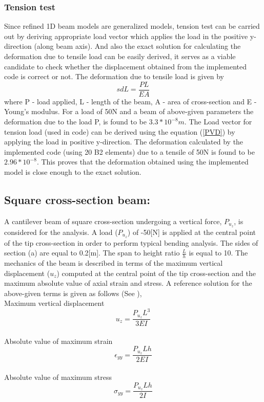\documentclass[a4paper,12pt]{article}
\begin{document}
\subsubsection*{Tension test}
\indent\indent\indent\indent Since refined 1D beam models are generalized models, tension test can be carried out by deriving appropriate load vector which applies the load in the positive y-direction (along beam axis). And also the exact solution for calculating the deformation due to tensile load can be easily derived, it serves as a viable candidate to check whether the displacement obtained from the implemented code is correct or not. The deformation due to tensile load is given by 
\begin{equation}s
dL = \frac{P L}{E A}
\label{exactdef}
\end{equation}
where P - load applied, L - length of the beam, A - area of cross-section and E - Young's modulus. For a load of 50N and a beam of above-given parameters the deformation due to the load P, is found to be $3.3*10^{-8}m$. The Load vector for tension load (used in code) can be derived using the equation (\ref{PVD}) by applying the load in positive y-direction. The deformation calculated by the implemented code (using 20 B2 elements) due to a tensile of 50N is found to be $2.96*10^{-8}$. This proves that the deformation obtained using the implemented model is close enough to the exact solution.
\newpage
\subsection*{Square cross-section beam:}
\indent\indent\indent\indent A cantilever beam of square cross-section undergoing a vertical force, $P_{u_{z}}$, is considered for the analysis. A load ($P_{u_{z}}$) of -50[N] is applied at the central point of the tip cross-section in order to perform typical bending analysis. The sides of section (a) are equal to 0.2[m]. The span to height ratio $\frac{L}{h}$ is equal to 10. The mechanics of the beam is described in terms of the maximum vertical displacement ($u_{z}$) computed at the central point of the tip cross-section and the maximum absolute value of axial strain and stress. A reference solution for the above-given terms is given as follows (See \cite{carrera2010refined}),\\
Maximum vertical displacement 
\begin{equation}
u_{z} = \frac{P_{u_{z}} L^{3}}{3 E I}
\label{u_z}
\end{equation}
\\
Absolute value of maximum strain
\begin{equation}
\epsilon_{yy} = \frac{P_{u_{z}} L h}{2 E I}
\label{eyy}
\end{equation}
\\
Absolute value of maximum stress
\begin{equation}
\sigma_{yy} = \frac{P_{u_{z}} L h}{2 I}
\label{syy}
\end{equation}
\end{document}
